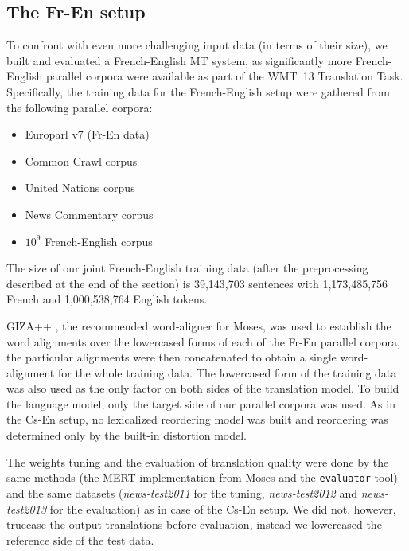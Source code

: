 \subsection{The Fr-En setup}

To confront \eppex{} with even more challenging input data (in terms of their size),
we built and evaluated a French-English MT system, as significantly more French-English parallel
corpora were available as part of the WMT~13 Translation Task. Specifically, the training data for
the French-English setup were gathered from the following parallel corpora:
\begin{itemize}
  \item Europarl v7 (Fr-En data)
  \item Common Crawl corpus
  \item United Nations corpus
  \item News Commentary corpus
  \item $10^9$ French-English corpus
\end{itemize}
The size of our joint French-English training data (after the preprocessing described
at the end of the section) is 39,143,703 sentences with 1,173,485,756 French and 1,000,538,764
English tokens.

GIZA++ \citep{och:giza}, the recommended word-aligner for Moses,
was used to establish the word alignments over the lowercased forms of each
of the Fr-En parallel corpora, the particular alignments were then concatenated to
obtain a single word-alignment for the whole training data.
The lowercased form of the training data was also used as the only factor on both sides of
the translation model.
To build the language model, only the target side of our parallel corpora was used.
As in the Cs-En setup, no lexicalized reordering model was built and reordering was
determined only by the built-in distortion model.

The weights tuning and the evaluation of translation quality were done by the same methods
(the MERT implementation from Moses and the \texttt{evaluator} tool) and the same datasets
(\emph{news-test2011} for the tuning, \emph{news-test2012} and \emph{news-test2013} for
the evaluation) as in case of the Cs-En setup. We did not, however, truecase the
output translations before evaluation, instead we lowercased the reference side of the test data.

